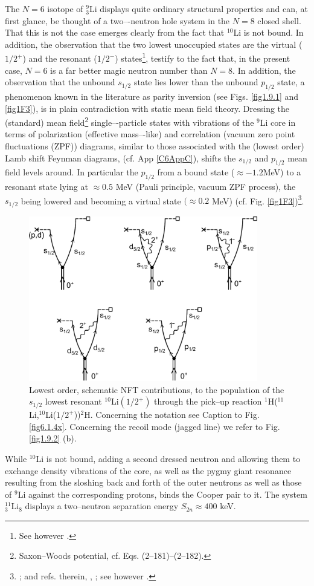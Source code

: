 The $N = 6$ isotope of $^9_3$Li displays quite ordinary structural properties and can, at first
glance, be thought of a two–-neutron hole system in the $N = 8$ closed shell. That this is not the case emerges clearly from the fact that $^{10}$Li is not bound. In addition, the observation that the two lowest unoccupied states are the  virtual ($1/2^+$) and the
resonant ($1/2^-$) states\footnote{See however \cite{Cavallaro:17}.}, testify to the fact that, in the present case,  $N = 6$ is a far better
magic neutron number  than $N = 8$. In addition, the observation  that the unbound $s_{1/2}$
state lies lower than the unbound $p_{1/2}$ state, a phenomenon known in the literature as parity inversion (see Figs. \ref{fig1.9.1} and \ref{fig1F3}), is in   plain contradiction with static mean field
theory. Dressing the (standard) mean field\footnote{ Saxon--Woods potential, cf. \cite{Bohr:69} Eqs. (2--181)--(2--182).} single–-particle states with vibrations of the $^9$Li core  in terms of
polarization (effective mass–-like) and correlation  (vacuum zero point fluctuations
(ZPF)) diagrams, similar to those associated with the (lowest order) Lamb shift Feynman
diagrams, (cf. App \ref{C6AppC}), shifts the $s_{1/2}$ and $p_{1/2}$ mean field levels around. In particular the $p_{1/2}$ from a
bound state ($\approx-1.2$MeV) to a resonant state lying at $\approx0.5$ MeV (Pauli principle, vacuum
ZPF process), the $s_{1/2}$ being lowered and becoming a virtual state $(\approx 0.2$ MeV) (cf. Fig. \ref{fig1F3})\footnote{\cite{Barranco:01}; and refs. therein, \cite{Tanihata:13}, \cite{Sanetullaev:16}; see however \cite{Cavallaro:17}.}.
 \begin{figure}
\centerline{\includegraphics*[width=10cm,angle=0]{C6/figs_C6/fig4_2_7}}
\caption{Lowest order, schematic NFT contributions, to the population of the $s_{1/2}$ lowest resonant $^{10}$Li$(1/2^+)$ through the pick--up reaction $^1$H($^{11}$Li,$^{10}$Li($1/2^+$))$^2$H. Concerning the notation see Caption to Fig. \ref{fig6.1.4x}. Concerning the recoil mode (jagged line) we refer to Fig. \ref{fig1.9.2} (b).}\label{fig4.2.7}
\end{figure}
While $^{10}$Li is not bound, adding a second dressed neutron and allowing them to exchange density vibrations of the  core, as well as the pygmy giant resonance resulting from the sloshing back and forth of the outer neutrons as well as those of $^9$Li against the corresponding protons, binds the Cooper pair to it. The system $^{11}_{3}$Li$_8$ displays a two--neutron separation energy $S_{2n}\approx 400$ keV.


